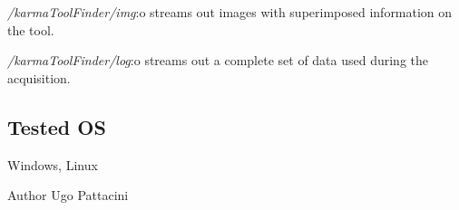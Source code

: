 \begin{DoxyItemize}
\begin{DoxyItemize}
\item {\itshape /karma\+Tool\+Finder/img}\+:o streams out images with superimposed information on the tool.
\item {\itshape /karma\+Tool\+Finder/log}\+:o streams out a complete set of data used during the acquisition.
\end{DoxyItemize}
\end{DoxyItemize}\hypertarget{group__karmaToolProjection_tested_os_sec}{}\subsection{Tested OS}\label{group__karmaToolProjection_tested_os_sec}
Windows, Linux

\begin{DoxyAuthor}{Author}
Ugo Pattacini 
\end{DoxyAuthor}
